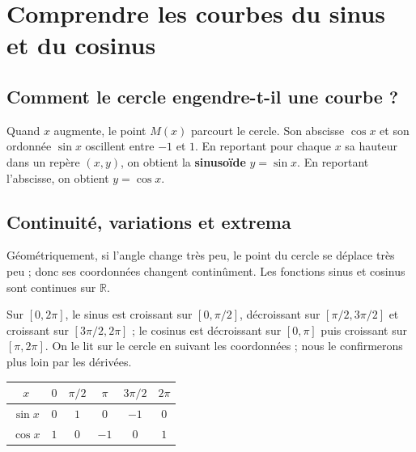 \documentclass[../cours_spe_trigo.tex]{subfiles}
\begin{document}
\setcounter{chapter}{9}
\chapter{Comprendre les courbes du sinus et du cosinus}
\section{Comment le cercle engendre-t-il une courbe ?}
Quand $x$ augmente, le point $M(x)$ parcourt le cercle. Son abscisse $\cos x$ et son ordonnée $\sin x$ oscillent entre $-1$ et $1$. En reportant pour chaque $x$ sa hauteur dans un repère $(x,y)$, on obtient la \textbf{sinusoïde} $y=\sin x$. En reportant l'abscisse, on obtient $y=\cos x$.
\begin{center}
\end{center}
\section{Continuité, variations et extrema}
Géométriquement, si l'angle change très peu, le point du cercle se déplace très peu ; donc ses coordonnées changent continûment. Les fonctions sinus et cosinus sont continues sur $\mathbb R$.

Sur $[0,2\pi]$, le sinus est croissant sur $[0,\pi/2]$, décroissant sur $[\pi/2,3\pi/2]$ et croissant sur $[3\pi/2,2\pi]$ ; le cosinus est décroissant sur $[0,\pi]$ puis croissant sur $[\pi,2\pi]$. On le lit sur le cercle en suivant les coordonnées ; nous le confirmerons plus loin par les dérivées.
\begin{center}
\begin{tabular}{c|ccccc}
\toprule
$x$ & $0$ & $\pi/2$ & $\pi$ & $3\pi/2$ & $2\pi$\\
\midrule
$\sin x$ & $0$ & $1$ & $0$ & $-1$ & $0$\\
$\cos x$ & $1$ & $0$ & $-1$ & $0$ & $1$\\
\bottomrule
\end{tabular}
\end{center}
\end{document}
